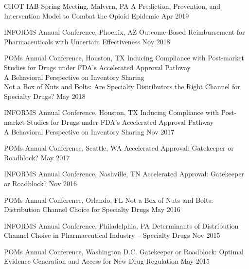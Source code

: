 \documentclass[a4paper, 10pt]{article}
\begin{document}
{\confHeading
  {CHOT IAB Spring Meeting, Malvern, PA}
  {A Prediction, Prevention, and Intervention Model to Combat the Opioid Epidemic}
  {Apr 2019}
  
\confHeading
  {INFORMS Annual Conference, Phoenix, AZ}
  {Outcome-Based Reimbursement for Pharmaceuticals with Uncertain Effectiveness}
  {Nov 2018}

\confHeading
  {POMs Annual Conference, Houston, TX}
  {Inducing Compliance with Post-market Studies for Drugs under FDA’s Accelerated Approval Pathway \\
  A Behavioral Perspective on Inventory Sharing \\
   Not a Box of Nuts and Bolts: Are Specialty Distributors the Right Channel for Specialty Drugs?}
  {May 2018}

\confHeading
  {INFORMS Annual Conference, Houston, TX}
  {Inducing Compliance with Post-market Studies for Drugs under FDA’s Accelerated Approval Pathway  
  \\
  A Behavioral Perspective on Inventory Sharing  }
  {Nov 2017}

\confHeading
  {POMs Annual Conference, Seattle, WA}
  {Accelerated Approval: Gatekeeper or Roadblock?}
  {May 2017}

\confHeading
  {INFORMS Annual Conference, Nashville, TN}
  {Accelerated Approval: Gatekeeper or Roadblock?}
  {Nov 2016}

\confHeading
  {POMs Annual Conference, Orlando, FL}
  {Not a Box of Nuts and Bolts: Distribution Channel Choice for Specialty Drugs}
  {May 2016}

\confHeading
  {INFORMS Annual Conference, Philadelphia, PA}
  {Determinants of Distribution Channel Choice in Pharmaceutical Industry – Specialty Drugs}
  {Nov 2015}

\confHeading
  {POMs Annual Conference, Washington D.C.}
  {Gatekeeper or Roadblock: Optimal Evidence Generation and Access for New Drug Regulation}
  {May 2015}
}
\end{document}
